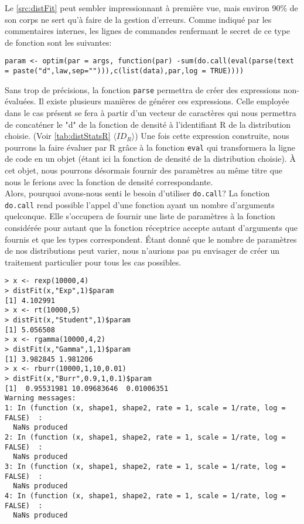 Le \autoref{src:distFit} peut sembler impressionnant à première vue, mais environ 90\% de son corps ne sert qu'à faire de la gestion d'erreurs. Comme indiqué par les commentaires internes, les lignes de commandes renfermant le secret de ce type de fonction sont les suivantes: \\

\begin{minipage}{\linewidth}
	\noindent
	\texttt{param <- optim(par = args, function(par) -sum(do.call(eval(parse(text = paste("d",law,sep=""))),c(list(data),par,log = TRUE))))}
\end{minipage}

\vspace{\baselineskip}
Sans trop de précisions, la fonction \texttt{parse} permettra de créer des expressions non-évaluées. Il existe plusieurs manières de générer ces expressions. Celle employée dans le cas présent se fera à partir d'un vecteur de caractères qui nous permettra de concaténer le "d" de la fonction de densité à l'identifiant R de la distribution choisie. (Voir \autoref{tab:distStatsR} $\langle ID_R \rangle$) Une fois cette expression construite, nous pourrons la faire évaluer par R grâce à la fonction \texttt{eval} qui transformera la ligne de code en un objet (étant ici la fonction de densité de la distribution choisie). À cet objet, nous pourrons désormais fournir des paramètres au même titre que nous le ferions avec la fonction de densité correspondante. \\

Alors, pourquoi avons-nous senti le besoin d'utiliser \texttt{do.call}? La fonction \texttt{do.call} rend possible l'appel d'une fonction ayant un nombre d'arguments quelconque. Elle s'occupera de fournir une liste de paramètres à la fonction considérée pour autant que la fonction réceptrice accepte autant d'arguments que fournis et que les types correspondent. Étant donné que le nombre de paramètres de nos distributions peut varier, nous n'aurions pas pu envisager de créer un traitement particulier pour tous les cas possibles.

\begin{lstlisting}[caption = Exemple d'utilisation de la fonction \texttt{distFit},label=src:distFitEx]
> x <- rexp(10000,4)
> distFit(x,"Exp",1)$param
[1] 4.102991
> x <- rt(10000,5)
> distFit(x,"Student",1)$param
[1] 5.056508
> x <- rgamma(10000,4,2)
> distFit(x,"Gamma",1,1)$param
[1] 3.982845 1.981206
> x <- rburr(10000,1,10,0.01)
> distFit(x,"Burr",0.9,1,0.1)$param
[1]  0.95531981 10.09683646  0.01006351
Warning messages:
1: In (function (x, shape1, shape2, rate = 1, scale = 1/rate, log = FALSE)  :
  NaNs produced
2: In (function (x, shape1, shape2, rate = 1, scale = 1/rate, log = FALSE)  :
  NaNs produced
3: In (function (x, shape1, shape2, rate = 1, scale = 1/rate, log = FALSE)  :
  NaNs produced
4: In (function (x, shape1, shape2, rate = 1, scale = 1/rate, log = FALSE)  :
  NaNs produced
\end{lstlisting}

